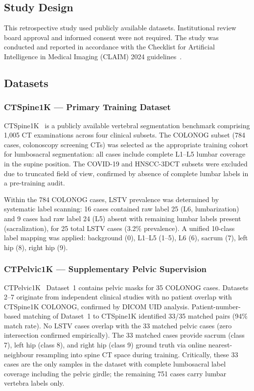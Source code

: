 \documentclass{article}
\begin{document}
\subsection{Study Design}

This retrospective study used publicly available datasets. Institutional review
board approval and informed consent were not required. The study was conducted
and reported in accordance with the Checklist for Artificial Intelligence in
Medical Imaging (CLAIM) 2024 guidelines~\citep{claim2024}.

\subsection{Datasets}

\subsubsection{CTSpine1K --- Primary Training Dataset}

CTSpine1K~\citep{li2021ctspine1k} is a publicly available vertebral
segmentation benchmark comprising 1,005 CT examinations across four clinical
subsets. The COLONOG subset (784 cases, colonoscopy screening CTs) was selected
as the appropriate training cohort for lumbosacral segmentation: all cases
include complete L1--L5 lumbar coverage in the supine position. The COVID-19
and HNSCC-3DCT subsets were excluded due to truncated field of view, confirmed
by absence of complete lumbar labels in a pre-training audit.

Within the 784 COLONOG cases, LSTV prevalence was determined by systematic
label scanning: 16 cases contained raw label 25 (L6, lumbarization) and 9
cases had raw label 24 (L5) absent with remaining lumbar labels present
(sacralization), for 25 total LSTV cases (3.2\% prevalence). A unified 10-class
label mapping was applied: background (0), L1--L5 (1--5), L6 (6), sacrum (7),
left hip (8), right hip (9).

\subsubsection{CTPelvic1K --- Supplementary Pelvic Supervision}

CTPelvic1K~\citep{liu2021ctpelvic1k} Dataset~1 contains pelvic masks for 35
COLONOG cases. Datasets 2--7 originate from independent clinical studies with
no patient overlap with CTSpine1K COLONOG, confirmed by DICOM UID analysis.
Patient-number-based matching of Dataset~1 to CTSpine1K identified 33/35
matched pairs (94\% match rate). No LSTV cases overlap with the 33 matched
pelvic cases (zero intersection confirmed empirically). The 33 matched cases
provide sacrum (class 7), left hip (class 8), and right hip (class 9) ground
truth via online nearest-neighbour resampling into spine CT space during
training. Critically, these 33 cases are the only samples in the dataset with
complete lumbosacral label coverage including the pelvic girdle; the remaining
751 cases carry lumbar vertebra labels only.
\end{document}
